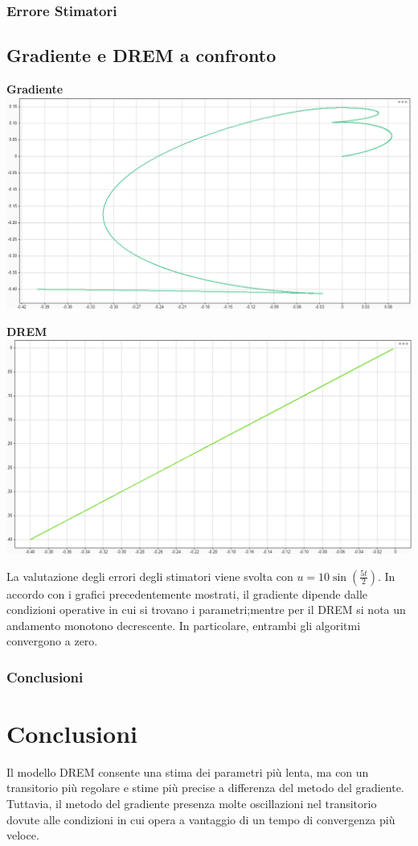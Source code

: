 \documentclass{beamer}
\begin{document}
\begin{frame}
	\frametitle{Errore Stimatori}
	\subsection{Gradiente e DREM a confronto}
	\begin{minipage}[t]{0.45\textwidth}
		\textbf{Gradiente}
		\includegraphics[scale=0.15]{2022-05-09-18-30-42.png}%
	\end{minipage}\hspace{1cm}
	\begin{minipage}[t]{0.45\textwidth}
		\textbf{DREM}
		\includegraphics[scale=0.15]{2022-05-09-18-27-09.png}%
	\end{minipage}
	La valutazione degli errori degli stimatori viene svolta con \(u=10\sin{(\frac{5t}{2})}\). In accordo con i grafici precedentemente mostrati, il gradiente dipende dalle condizioni operative in cui si trovano i parametri;mentre per il DREM si nota un andamento monotono decrescente. In particolare, entrambi gli algoritmi convergono a zero.
\end{frame}
\begin{frame}
	\frametitle{Conclusioni}
	\section{Conclusioni}
	Il modello DREM consente una stima dei parametri più lenta, ma con un transitorio più regolare e stime più precise a differenza del metodo del gradiente. Tuttavia, il metodo del gradiente presenza molte oscillazioni nel transitorio dovute alle condizioni in cui opera a vantaggio di un tempo di convergenza più veloce.
\end{frame}
\end{document}
